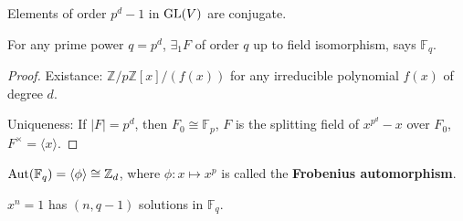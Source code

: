 \documentclass[a4paper,11pt]{article}
\begin{document}
\begin{proposition}
    Elements of order $p^d-1$ in $\mathrm{GL}(V)$ are conjugate.
\end{proposition}

\begin{proposition}
    For any prime power $q=p^d$, $\exists_1 F$ of order $q$ up to field isomorphism, says $\mathbb{F}_q$. 
\end{proposition}
\begin{proof}
    Existance: $\mathbb{Z}/p\mathbb{Z}[x]/(f(x))$ for any irreducible polynomial $f(x)$ of degree $d$.

    Uniqueness: If $|F|=p^d$, then $F_0\cong \mathbb{F}_p$,  $F$ is the splitting field of $x^{p^d}-x$ over $F_0$, $F^\times=\langle x\rangle$. 
\end{proof}

\begin{lemma}
    $\mathrm{Aut}(\mathbb{F}_q)=\langle \phi\rangle\cong\mathbb{Z}_d$, where $\phi:x\mapsto x^p$ is called the \textbf{Frobenius automorphism}.
\end{lemma}



\begin{lemma}
    $x^n=1$ has $(n,q-1)$ solutions in $\mathbb{F}_q$.
\end{lemma}


\ifx\ChapThreeSecOne\undefined %
     
\end{document}
